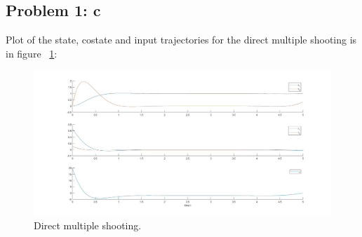 \subsection{Problem 1: c}

Plot of the state, costate and input trajectories for the direct multiple shooting is in figure \Fig~\ref{fig:direct}:
\begin{figure}[h]
	\centering
	\includegraphics[width=0.8\linewidth]{ImageFiles/indirect}
	\caption{Direct multiple shooting.}
	\label{fig:direct}
\end{figure}